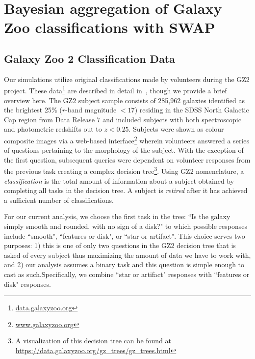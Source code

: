 
\chapter{Bayesian aggregation of Galaxy Zoo classifications with SWAP}
\label{chap:2}



\section{Galaxy Zoo 2 Classification Data} \label{sec: data}

Our simulations utilize original classifications made by volunteers during the
 GZ2 project. These data\footnote{\url{data.galaxyzoo.org}} are described in detail
 in~\cite{Willett2013}, though we provide a brief overview here.  The GZ2 subject sample
 consists of 285,962 galaxies identified as the brightest 25\% ($r$-band magnitude $< 17$)
 residing in the SDSS North Galactic Cap region from Data Release 7 and included 
subjects with both spectroscopic and photometric redshifts out to $z < 0.25$.
Subjects were shown as colour composite images via a web-based
 interface\footnote{\url{www.galaxyzoo.org}} wherein volunteers answered a 
series of questions pertaining to the morphology of the subject. With the exception 
of the first question, subsequent queries were dependent on volunteer responses 
from the previous task creating a complex decision tree\footnote{A visualization of this decision tree can be found at \url{https://data.galaxyzoo.org/gz_trees/gz_trees.html}}. Using GZ2 nomenclature, 
 a \textit{classification} is the total amount of information about a subject 
obtained by completing all tasks in the decision tree. A subject is \textit{retired} 
after it has achieved a sufficient number of classifications.


For our current analysis, we choose the first task in the tree: ``Is the galaxy simply 
smooth and rounded, with no sign of a disk?" to which possible responses include 
``smooth", ``features or disk", or ``star or artifact". This choice serves 
two purposes: 1) this is one of only two questions in the GZ2 decision tree that 
is asked of every subject thus maximizing the amount of data we have to work with, 
and 2) our analysis assumes a binary task and this question is simple enough to cast as such.Specifically, we combine ``star or artifact" responses with ``features or disk" responses.

